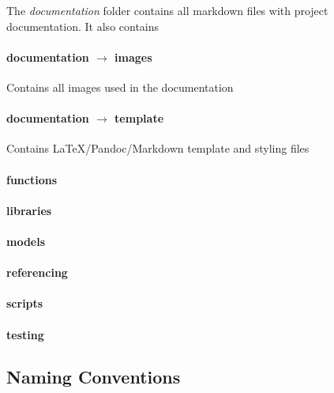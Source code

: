 \documentclass[]{article}
\let\oldparagraph\paragraph
\renewcommand{\paragraph}[1]{\oldparagraph{#1}\mbox{}}
\begin{document}
The \emph{documentation} folder contains all markdown files with project
documentation. It also contains

\paragraph{\texorpdfstring{documentation \(\rightarrow\)
images}{documentation \textbackslash{}rightarrow images}}\label{documentation-rightarrow-images}

Contains all images used in the documentation

\paragraph{\texorpdfstring{documentation \(\rightarrow\)
template}{documentation \textbackslash{}rightarrow template}}\label{documentation-rightarrow-template}

Contains LaTeX/Pandoc/Markdown template and styling files

\paragraph{functions}\label{functions}

\paragraph{libraries}\label{libraries}

\paragraph{models}\label{models}

\paragraph{referencing}\label{referencing}

\paragraph{scripts}\label{scripts}

\paragraph{testing}\label{testing}

\subsection{Naming Conventions}\label{naming-conventions}
\end{document}
